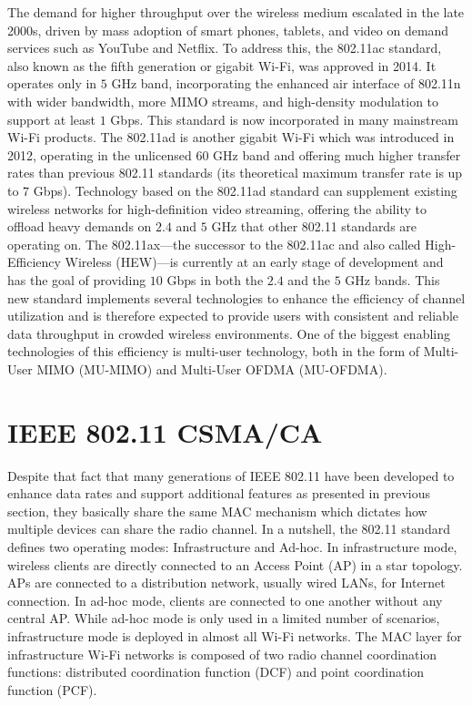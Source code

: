 The demand for higher throughput over the wireless medium escalated in the late 2000s, driven by mass adoption of smart phones, tablets, and video on demand services such as YouTube and Netflix. To address this, the 802.11ac standard, also known as the fifth generation or gigabit \mbox{Wi-Fi}, was approved in 2014. It operates only in $5$ GHz band, incorporating the enhanced air interface of 802.11n with wider bandwidth, more MIMO streams, and high-density modulation to support at least $1$ Gbps. This standard is now incorporated in many mainstream \mbox{Wi-Fi} products. The 802.11ad is another gigabit \mbox{Wi-Fi} which was introduced in 2012, operating in the unlicensed $60$ GHz band and offering much higher transfer rates than previous 802.11 standards (its theoretical maximum transfer rate is up to $7$ Gbps). Technology based on the 802.11ad standard can supplement existing wireless networks for high-definition video streaming, offering the ability to offload heavy demands on $2.4$ and $5$ GHz that other 802.11 standards are operating on. The 802.11ax---the successor to the 802.11ac and also called  High-Efficiency Wireless (HEW)---is currently at an early stage of development and has the goal of providing $10$ Gbps in both the $2.4$ and the $5$ GHz bands. This new standard implements several technologies to enhance the efficiency of channel utilization and is therefore expected to provide users with consistent and reliable data throughput in crowded wireless environments. One of the biggest enabling technologies of this efficiency is multi-user technology, both in the form of Multi-User MIMO (MU-MIMO) and Multi-User OFDMA (MU-OFDMA).


\section{IEEE 802.11 CSMA/CA}
\label{csma}

Despite that fact that many generations of IEEE 802.11 have been developed to enhance data rates and support additional features as presented in previous section, they basically share the same MAC mechanism which dictates how multiple devices can share the radio channel. In a nutshell, the 802.11 standard defines two operating modes: Infrastructure and Ad-hoc. In infrastructure mode, wireless clients are directly connected to an Access Point (AP) in a star topology. APs are connected to a distribution network, usually wired LANs, for Internet connection. In ad-hoc mode, clients are connected to one another without any central AP. While ad-hoc mode is only used in a limited number of scenarios, infrastructure mode is deployed in almost all \mbox{Wi-Fi} networks. The MAC layer for  infrastructure \mbox{Wi-Fi} networks is composed of two radio channel coordination functions: distributed coordination function (DCF) and point coordination function (PCF).

